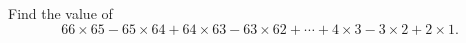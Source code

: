 Find the value of
\[66\times65-65\times64+64\times63-63\times62+\cdots+4\times3-3\times2+2\times1 .\]
